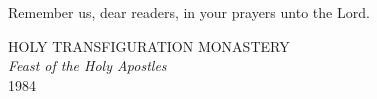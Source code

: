 Remember us, dear readers, in your prayers unto the Lord.

{
	\vspace{.5cm}
	\hspace*{\fill} {\color{red}HOLY TRANSFIGURATION MONASTERY}
	\vspace{.5cm}
}\\
\textit{Feast of the Holy Apostles}\\
1984
